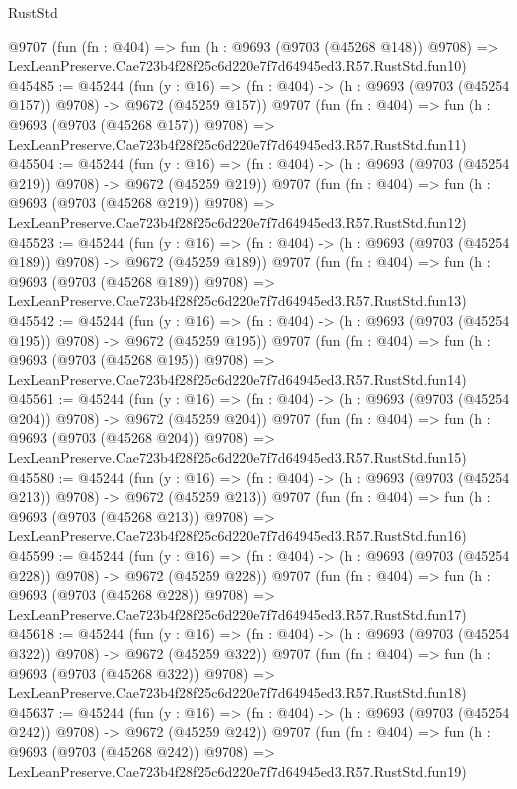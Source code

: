 \begin{lexlean}{RustStd}
\begin{coremodule}
    @9707
    (fun (fn : @404) =>
    fun (h : @9693 (@9703 (@45268 @148)) @9708) =>
    LexLeanPreserve.Cae723b4f28f25c6d220e7f7d64945ed3.R57.RustStd.fun10)
@45485 := @45244
    (fun (y : @16) => (fn : @404) -> (h : @9693 (@9703 (@45254 @157)) @9708) -> @9672 (@45259 @157))
    @9707
    (fun (fn : @404) =>
    fun (h : @9693 (@9703 (@45268 @157)) @9708) =>
    LexLeanPreserve.Cae723b4f28f25c6d220e7f7d64945ed3.R57.RustStd.fun11)
@45504 := @45244
    (fun (y : @16) => (fn : @404) -> (h : @9693 (@9703 (@45254 @219)) @9708) -> @9672 (@45259 @219))
    @9707
    (fun (fn : @404) =>
    fun (h : @9693 (@9703 (@45268 @219)) @9708) =>
    LexLeanPreserve.Cae723b4f28f25c6d220e7f7d64945ed3.R57.RustStd.fun12)
@45523 := @45244
    (fun (y : @16) => (fn : @404) -> (h : @9693 (@9703 (@45254 @189)) @9708) -> @9672 (@45259 @189))
    @9707
    (fun (fn : @404) =>
    fun (h : @9693 (@9703 (@45268 @189)) @9708) =>
    LexLeanPreserve.Cae723b4f28f25c6d220e7f7d64945ed3.R57.RustStd.fun13)
@45542 := @45244
    (fun (y : @16) => (fn : @404) -> (h : @9693 (@9703 (@45254 @195)) @9708) -> @9672 (@45259 @195))
    @9707
    (fun (fn : @404) =>
    fun (h : @9693 (@9703 (@45268 @195)) @9708) =>
    LexLeanPreserve.Cae723b4f28f25c6d220e7f7d64945ed3.R57.RustStd.fun14)
@45561 := @45244
    (fun (y : @16) => (fn : @404) -> (h : @9693 (@9703 (@45254 @204)) @9708) -> @9672 (@45259 @204))
    @9707
    (fun (fn : @404) =>
    fun (h : @9693 (@9703 (@45268 @204)) @9708) =>
    LexLeanPreserve.Cae723b4f28f25c6d220e7f7d64945ed3.R57.RustStd.fun15)
@45580 := @45244
    (fun (y : @16) => (fn : @404) -> (h : @9693 (@9703 (@45254 @213)) @9708) -> @9672 (@45259 @213))
    @9707
    (fun (fn : @404) =>
    fun (h : @9693 (@9703 (@45268 @213)) @9708) =>
    LexLeanPreserve.Cae723b4f28f25c6d220e7f7d64945ed3.R57.RustStd.fun16)
@45599 := @45244
    (fun (y : @16) => (fn : @404) -> (h : @9693 (@9703 (@45254 @228)) @9708) -> @9672 (@45259 @228))
    @9707
    (fun (fn : @404) =>
    fun (h : @9693 (@9703 (@45268 @228)) @9708) =>
    LexLeanPreserve.Cae723b4f28f25c6d220e7f7d64945ed3.R57.RustStd.fun17)
@45618 := @45244
    (fun (y : @16) => (fn : @404) -> (h : @9693 (@9703 (@45254 @322)) @9708) -> @9672 (@45259 @322))
    @9707
    (fun (fn : @404) =>
    fun (h : @9693 (@9703 (@45268 @322)) @9708) =>
    LexLeanPreserve.Cae723b4f28f25c6d220e7f7d64945ed3.R57.RustStd.fun18)
@45637 := @45244
    (fun (y : @16) => (fn : @404) -> (h : @9693 (@9703 (@45254 @242)) @9708) -> @9672 (@45259 @242))
    @9707
    (fun (fn : @404) =>
    fun (h : @9693 (@9703 (@45268 @242)) @9708) =>
    LexLeanPreserve.Cae723b4f28f25c6d220e7f7d64945ed3.R57.RustStd.fun19)

\end{coremodule}
\end{lexlean}

